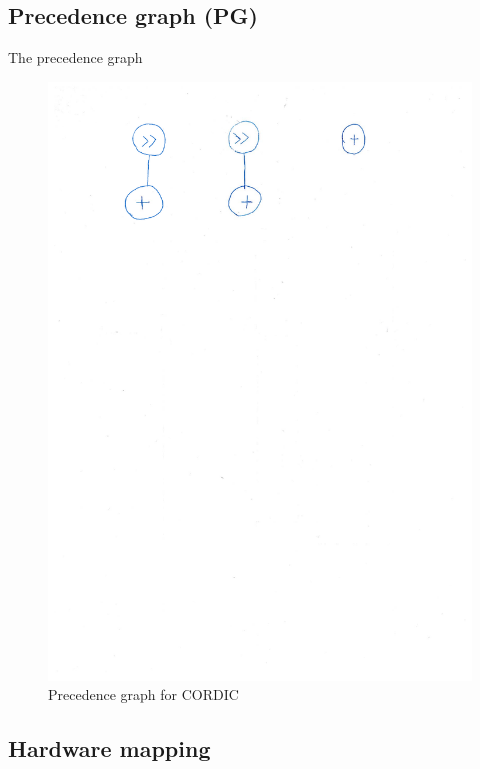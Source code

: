 \documentclass[12pt, a4paper,oneside]{article}
\begin{document}
\subsection{Precedence graph (PG)}
The precedence graph
\begin{figure}[H]
	\centering
	\includegraphics[width = \linewidth,trim=0 22.9cm 0 2cm, clip]{sequencediagram.pdf}
	\caption{Precedence graph for CORDIC}
	\label{fig:cordic_pg}
\end{figure}

\subsection{Hardware mapping}
\end{document}

